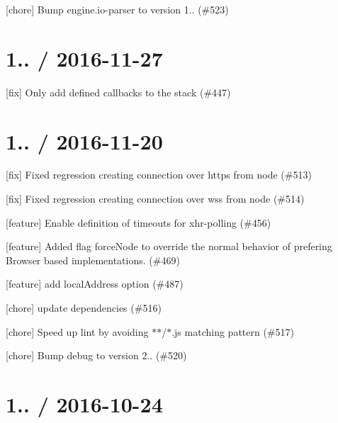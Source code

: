 
\begin{DoxyItemize}
\item \mbox{[}chore\mbox{]} Bump engine.\+io-\/parser to version 1.. (\#523)
\end{DoxyItemize}

\section*{1.. / 2016-\/11-\/27 }


\begin{DoxyItemize}
\item \mbox{[}fix\mbox{]} Only add defined callbacks to the stack (\#447)
\end{DoxyItemize}

\section*{1.. / 2016-\/11-\/20 }


\begin{DoxyItemize}
\item \mbox{[}fix\mbox{]} Fixed regression creating connection over https from node (\#513)
\item \mbox{[}fix\mbox{]} Fixed regression creating connection over wss from node (\#514)
\item \mbox{[}feature\mbox{]} Enable definition of timeouts for xhr-\/polling (\#456)
\item \mbox{[}feature\mbox{]} Added flag force\+Node to override the normal behavior of prefering Browser based implementations. (\#469)
\item \mbox{[}feature\mbox{]} add local\+Address option (\#487)
\item \mbox{[}chore\mbox{]} update dependencies (\#516)
\item \mbox{[}chore\mbox{]} Speed up lint by avoiding \textquotesingle{}$\ast$$\ast$/$\ast$.js\textquotesingle{} matching pattern (\#517)
\item \mbox{[}chore\mbox{]} Bump debug to version 2.. (\#520)
\end{DoxyItemize}

\section*{1.. / 2016-\/10-\/24 }


